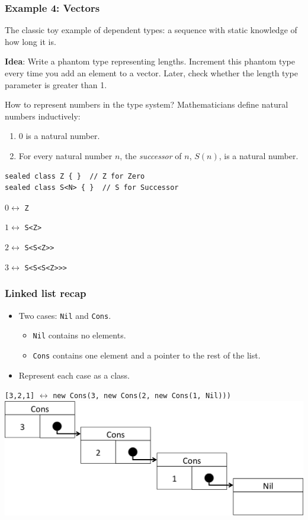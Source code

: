\documentclass{beamer}
\begin{document}
  \begin{frame}[fragile]
    \frametitle{Example 4: Vectors}
    The classic toy example of dependent types: a sequence with static knowledge of how long it is.
    
    \textbf{Idea}: Write a phantom type representing lengths.
    Increment this phantom type every time you add an element to a vector.
    Later, check whether the length type parameter is greater than 1.
    
    \pause
    \vfill
    How to represent numbers in the type system?
    Mathematicians define natural numbers inductively:
    \begin{enumerate}
      \item $0$ is a natural number.
      \item For every natural number $n$, the \emph{successor} of $n$, $S(n)$, is a natural number.
    \end{enumerate}
    \begin{verbatim}
sealed class Z { }  // Z for Zero
sealed class S<N> { }  // S for Successor
    \end{verbatim}
    
    $0 \leftrightarrow$ \texttt{Z}
    
    $1 \leftrightarrow$ \texttt{S<Z>}
    
    $2 \leftrightarrow$ \texttt{S<S<Z>>}
    
    $3 \leftrightarrow$ \texttt{S<S<S<Z>>>}
\end{frame}

  \begin{frame}
    \frametitle{Linked list recap}
    \begin{itemize}
      \item Two cases: \texttt{Nil} and \texttt{Cons}.
      \begin{itemize}
        \item \texttt{Nil} contains no elements.
        \item \texttt{Cons} contains one element and a pointer to the rest of the list.
      \end{itemize}
      \item Represent each case as a class.
    \end{itemize}
    \texttt{[3,2,1]} $\leftrightarrow$ \texttt{new Cons(3, new Cons(2, new Cons(1, Nil)))}
    \vfill
    \includegraphics[scale=0.5]{linkedlist.png}
  \end{frame}
\end{document}
